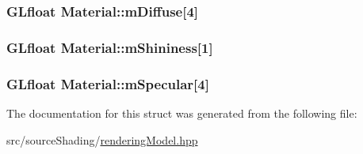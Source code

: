 \subsubsection[{\texorpdfstring{m\+Diffuse}{mDiffuse}}]{\setlength{\rightskip}{0pt plus 5cm}G\+Lfloat Material\+::m\+Diffuse\mbox{[}4\mbox{]}}\hypertarget{struct_material_acedb2e5253e0891df7870845793f5ca2}{}\label{struct_material_acedb2e5253e0891df7870845793f5ca2}
\subsubsection[{\texorpdfstring{m\+Shininess}{mShininess}}]{\setlength{\rightskip}{0pt plus 5cm}G\+Lfloat Material\+::m\+Shininess\mbox{[}1\mbox{]}}\hypertarget{struct_material_a6b74b1568a229d6f3306ce9c127ae256}{}\label{struct_material_a6b74b1568a229d6f3306ce9c127ae256}
\subsubsection[{\texorpdfstring{m\+Specular}{mSpecular}}]{\setlength{\rightskip}{0pt plus 5cm}G\+Lfloat Material\+::m\+Specular\mbox{[}4\mbox{]}}\hypertarget{struct_material_a1cab5986665fe4aaa3c9657ad513f596}{}\label{struct_material_a1cab5986665fe4aaa3c9657ad513f596}


The documentation for this struct was generated from the following file\+:\begin{DoxyCompactItemize}
\item 
src/source\+Shading/\hyperlink{rendering_model_8hpp}{rendering\+Model.\+hpp}\end{DoxyCompactItemize}
